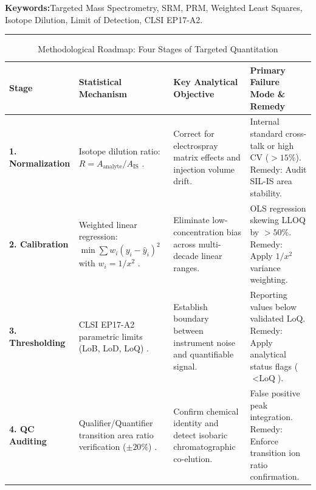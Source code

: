 \documentclass[11pt,twoside,openright]{book}
\begin{document}
\noindent
\textbf{Keywords:}\enspace Targeted Mass Spectrometry, SRM, PRM, Weighted Least Squares, Isotope Dilution, Limit of Detection, CLSI EP17-A2.

\vspace{0.8em}
\noindent\rule{\textwidth}{0.4pt}


\begin{table}[ht]
\centering
\caption{Methodological Roadmap: Four Stages of Targeted Quantitation}
\label{tab:targeted_roadmap}
\small
\begin{tabularx}{\textwidth}{l p{3.8cm} p{4.2cm} X}
\toprule
\textbf{Stage} & \textbf{Statistical Mechanism} & \textbf{Key Analytical Objective} & \textbf{Primary Failure Mode \& Remedy} \\
\midrule
\textbf{1. Normalization} & Isotope dilution ratio: $R = A_{\text{analyte}} / A_{\text{IS}}$ \cite{matuszewski2003strategies, ong2002stable}. & Correct for electrospray matrix effects and injection volume drift. & Internal standard cross-talk or high CV ($>15\%$). Remedy: Audit SIL-IS area stability. \\
\addlinespace
\textbf{2. Calibration} & Weighted linear regression: $\min \sum w_i (y_i - \hat{y}_i)^2$ with $w_i = 1/x^2$ \cite{mani2012statistical, fda2018bioanalytical}. & Eliminate low-concentration bias across multi-decade linear ranges. & OLS regression skewing LLOQ by $>50\%$. Remedy: Apply $1/x^2$ variance weighting. \\
\addlinespace
\textbf{3. Thresholding} & CLSI EP17-A2 parametric limits (LoB, LoD, LoQ) \cite{clsi2012ep17, currie1968limits}. & Establish boundary between instrument noise and quantifiable signal. & Reporting values below validated LoQ. Remedy: Apply analytical status flags ($<\text{LoQ}$). \\
\addlinespace
\textbf{4. QC Auditing} & Qualifier/Quantifier transition area ratio verification ($\pm 20\%$) \cite{carr2014targeted, maclean2010skyline}. & Confirm chemical identity and detect isobaric chromatographic co-elution. & False positive peak integration. Remedy: Enforce transition ion ratio confirmation. \\
\bottomrule
\end{tabularx}
\end{table}

\FloatBarrier
\end{document}
